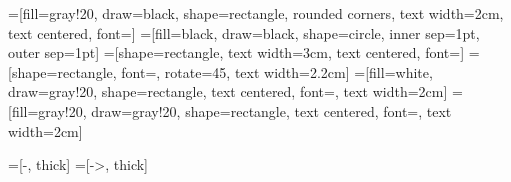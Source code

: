 \def\0b{\mathbf{0}}
\def\Db{\mathbf{D}}
\def\kb{\mathbf{k}}
\def\Kb{\mathbf{K}}
\def\Ib{\mathbf{I}}
\def\Sb{\mathbf{S}}
\def\GP{\mathsf{GP}}
\newcommand{\bea}{\begin{eqnarray*}}
\newcommand{\eea}{\end{eqnarray*}}
\newcommand{\be}{\begin{eqnarray}}
\newcommand{\ee}{\end{eqnarray}}
\def\wb{\mathbf{w}}
\def\SE{{\mathcal{E}}}%
\def\SN{{\mathcal{N}}}%
\def\pb{\mathbf{p}}
\newcommand{\Kbarbar}{\overline{K}_{|m}}
\newcommand{\Kbarbarb}{\overline{\Kb}_{|m}}
\def\mve{\varepsilon}
\newcommand{\Kbarbarp}{\overline{K'}_{|m}}
\newcommand{\Kbarbarpb}{\overline{\Kb'}_{|m}}
\newcommand{\fin} {\mbox{}~\hfill{\lower-0.3ex\hbox{$\triangleleft$}}}
\def\e1{\mathrm{e}}




=[fill={gray!20}, draw=black, shape=rectangle, rounded corners, text width=2cm, text centered, font={\scriptsize}]
=[fill=black, draw=black, shape=circle, inner sep=1pt, outer sep=1pt]
=[shape=rectangle, text width=3cm, text centered, font={\scriptsize}]
=[shape=rectangle, font={\scriptsize}, rotate=45, text width=2.2cm]
=[fill=white, draw={gray!20}, shape=rectangle, text centered, font={\scriptsize}, text width=2cm]
=[fill={gray!20}, draw={gray!20}, shape=rectangle, text centered, font={\scriptsize}, text width=2cm]

=[-, thick]
=[->, thick]



\makeglossaries

